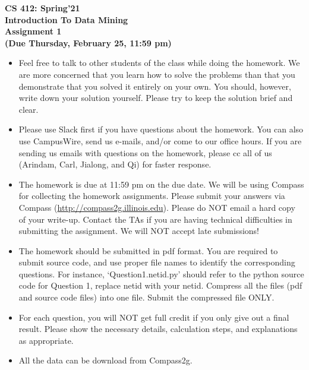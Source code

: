 \documentclass[11pt]{article}
\begin{document}
	\begin{center}
		{\bf {\huge CS 412: Spring'21}}\\
		\vspace*{2mm}
		{\bf {\huge Introduction To Data Mining}}\\
		\vspace*{5mm}
		{\bf {\huge Assignment 1}\\ \vspace*{2mm} {\large (Due Thursday, February 25, 11:59 pm)}}
	\end{center}
	\par \noindent


\begin{itemize}
\item Feel free to talk to other students of the class while doing the homework. We are more concerned that you learn how to solve the problems than that you demonstrate that you solved it entirely on your own. You should, however, write down your solution yourself. Please try to keep the solution brief and clear.
\item Please use Slack first if you have questions about the homework. You can also use CampusWire, send us e-mails, and/or come to our office hours. If you are sending us emails with questions on the homework, please cc all of us (Arindam, Carl, Jialong, and Qi) for faster response.
\item The homework is due at 11:59 pm on the due date. We will be using Compass for collecting the homework assignments. Please submit your answers via Compass (\url{http://compass2g.illinois.edu}). Please do NOT email a hard copy of your write-up. Contact the TAs if you are having technical difficulties in submitting the assignment. We will NOT accept late submissions!
\item The homework should be submitted in pdf format. You are required to submit source code, and use proper file names to identify the corresponding questions. For instance, ‘Question1.netid.py’ should refer to the python source code for Question 1, replace netid with your netid. Compress all the files (pdf and source code files) into one file. Submit the compressed file ONLY.
\item For each question, you will NOT get full credit if you only give out a final result. Please show the necessary details, calculation steps, and explanations as appropriate.
\item All the data can be download from Compass2g.
\end{itemize}
\end{document}
